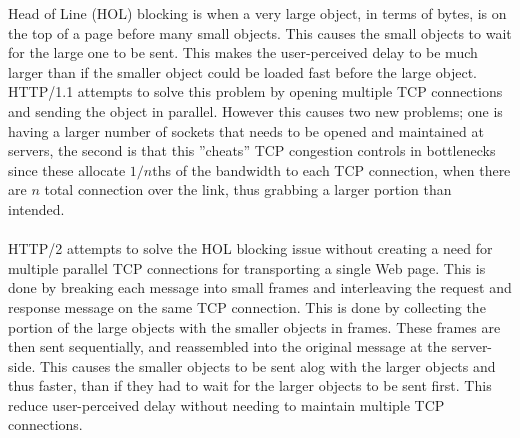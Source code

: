Head of Line (HOL) blocking is when a very large object, in terms of bytes, is on the top of a page before many small objects. This causes the small objects to wait for the large one to be sent. This makes the user-perceived delay to be much larger than if the smaller object could be loaded fast before the large object. HTTP/1.1 attempts to solve this problem by opening multiple TCP connections and sending the object in parallel. However this causes two new problems; one is having a larger number of sockets that needs to be opened and maintained at servers, the second is that this ''cheats'' TCP congestion controls in bottlenecks since these allocate $1/n$ths of the bandwidth to each TCP connection, when there are $n$ total connection over the link, thus grabbing a larger portion than intended. \\
\\
HTTP/2 attempts to solve the HOL blocking issue without creating a need for multiple parallel TCP connections for transporting a single Web page. This is done by breaking each message into small frames and interleaving the request and response message on the same TCP connection. This is done by collecting the portion of the large objects with the smaller objects in frames. These frames are then sent sequentially, and reassembled into the original message at the server-side. This causes the smaller objects to be sent alog with the larger objects and thus faster, than if they had to wait for the larger objects to be sent first. This reduce user-perceived delay without needing to maintain multiple TCP connections.